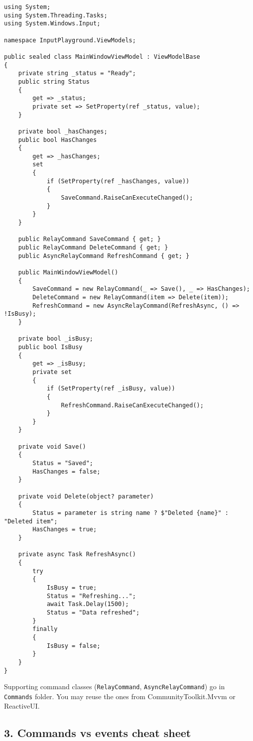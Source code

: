 \begin{lstlisting}
using System;
using System.Threading.Tasks;
using System.Windows.Input;

namespace InputPlayground.ViewModels;

public sealed class MainWindowViewModel : ViewModelBase
{
    private string _status = "Ready";
    public string Status
    {
        get => _status;
        private set => SetProperty(ref _status, value);
    }

    private bool _hasChanges;
    public bool HasChanges
    {
        get => _hasChanges;
        set
        {
            if (SetProperty(ref _hasChanges, value))
            {
                SaveCommand.RaiseCanExecuteChanged();
            }
        }
    }

    public RelayCommand SaveCommand { get; }
    public RelayCommand DeleteCommand { get; }
    public AsyncRelayCommand RefreshCommand { get; }

    public MainWindowViewModel()
    {
        SaveCommand = new RelayCommand(_ => Save(), _ => HasChanges);
        DeleteCommand = new RelayCommand(item => Delete(item));
        RefreshCommand = new AsyncRelayCommand(RefreshAsync, () => !IsBusy);
    }

    private bool _isBusy;
    public bool IsBusy
    {
        get => _isBusy;
        private set
        {
            if (SetProperty(ref _isBusy, value))
            {
                RefreshCommand.RaiseCanExecuteChanged();
            }
        }
    }

    private void Save()
    {
        Status = "Saved";
        HasChanges = false;
    }

    private void Delete(object? parameter)
    {
        Status = parameter is string name ? $"Deleted {name}" : "Deleted item";
        HasChanges = true;
    }

    private async Task RefreshAsync()
    {
        try
        {
            IsBusy = true;
            Status = "Refreshing...";
            await Task.Delay(1500);
            Status = "Data refreshed";
        }
        finally
        {
            IsBusy = false;
        }
    }
}
\end{lstlisting}

Supporting command classes (\passthrough{\lstinline!RelayCommand!},
\passthrough{\lstinline!AsyncRelayCommand!}) go in
\passthrough{\lstinline!Commands!} folder. You may reuse the ones from
CommunityToolkit.Mvvm or ReactiveUI.

\subsection{3. Commands vs events cheat
sheet}\label{commands-vs-events-cheat-sheet}

